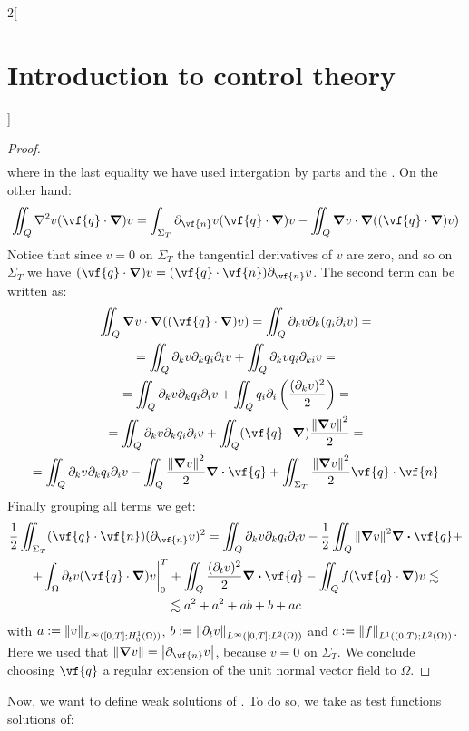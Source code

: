 \documentclass[../../../main_math.tex]{subfiles}
\begin{document}
\begin{multicols}{2}[\section{Introduction to control theory}]
\begin{proof}
\begin{multline*}
    \end{multline*}
    where in the last equality we have used intergation by parts and the . On the other hand:
    \begin{multline*}
      \iint_Q \laplacian v (\vf{q}\cdot \grad) v = \int_{\Sigma_T}\partial_{\vf{n}}v(\vf{q}\cdot \grad) v - \iint_Q \grad v \cdot \grad ((\vf{q}\cdot \grad) v)
    \end{multline*}
    Notice that since $v=0$ on $\Sigma_T$ the tangential derivatives of $v$ are zero, and so on $\Sigma_T$ we have $(\vf{q}\cdot \grad) v = (\vf{q}\cdot \vf{n})\partial_{\vf{n}}v$.
    The second term can be written as:
    \begin{multline*}
      \iint_Q \grad v \cdot \grad ((\vf{q}\cdot \grad) v) = \iint_Q\partial_kv\partial_k (q_i\partial_iv)=\\=\iint_Q\partial_kv\partial_kq_i \partial_iv + \iint_Q\partial_kvq_i\partial_{ki}v=\\= \iint_Q\partial_kv\partial_kq_i \partial_iv + \iint_Qq_i\partial_i\left(\frac{(\partial_kv)^2}{2}\right)=\\=
      \iint_Q\partial_kv\partial_kq_i \partial_iv + \iint_Q(\vf{q}\cdot \grad)\frac{\norm{\grad v}^2}{2}=\\= \iint_Q\partial_kv\partial_kq_i \partial_iv - \iint_Q\frac{\norm{\grad v}^2}{2}\div \vf{q}+\iint_{\Sigma_T}\frac{\norm{\grad v}^2}{2} \vf{q} \cdot \vf{n}
    \end{multline*}
    Finally grouping all terms we get:
    \begin{multline*}
      \frac{1}{2}\iint_{\Sigma_T} (\vf{q} \cdot \vf{n})(\partial_{\vf{n}}v)^2=\iint_Q\partial_kv\partial_kq_i \partial_iv -\frac{1}{2} \iint_Q \norm{\grad v}^2\div \vf{q} +\\+ \int_\Omega\partial_tv (\vf{q}\cdot \grad) v\bigg|_0^T + \iint_Q \frac{(\partial_t v)^2}{2} \div \vf{q} -\iint_Q f (\vf{q}\cdot \grad) v\lesssim\\ \lesssim a^2+a^2+ab+b+ac
    \end{multline*}
    with $a:=\norm{v}_{L^\infty([0,T]; H_0^1(\Omega))}$, $b:=\norm{\partial_t v}_{L^\infty([0,T]; L^2(\Omega))}$ and $c:=\norm{f}_{L^1((0,T); L^2(\Omega))}$. Here we used that $\norm{\grad v}=\abs{\partial_{\vf{n}}v}$, because $v=0$ on $\Sigma_T$.
    We conclude choosing $\vf{q}$ a regular extension of the unit normal vector field to $\Omega$.
  \end{proof}
  Now, we want to define weak solutions of . To do so, we take as test functions solutions of:

\end{multicols}
\end{document}
